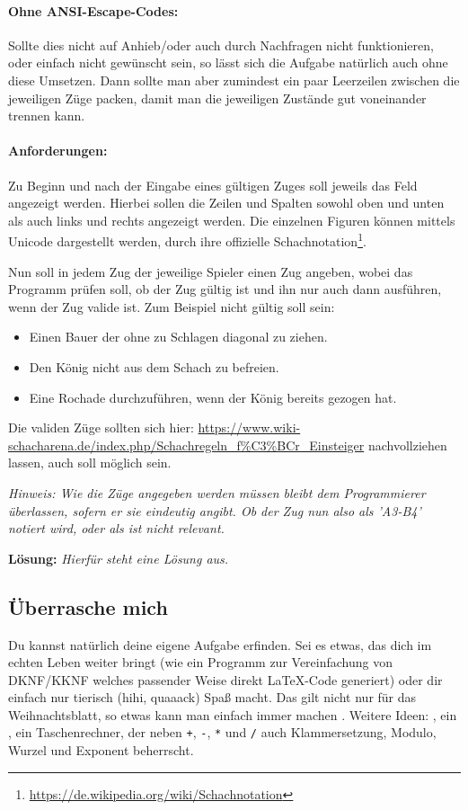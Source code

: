 \documentclass[table]{sopra-base}
\makeatletter
\let\T\texttt
\newenvironment{solution}{\null\par\noindent\textbf{\textcolor{sob@col@uulm@cs}{Lösung:}}\newline\bgroup\color{black}\slshape\ignorespaces}{\egroup}
\makeatother
\begin{document}
\paragraph{Ohne ANSI-Escape-Codes:}
Sollte dies nicht auf Anhieb/oder auch durch Nachfragen nicht funktionieren, oder einfach nicht gewünscht sein, so lässt sich die Aufgabe natürlich auch ohne diese Umsetzen.
Dann sollte man aber zumindest ein paar Leerzeilen zwischen die jeweiligen Züge packen, 
damit man die jeweiligen Zustände gut voneinander trennen kann.

\paragraph{Anforderungen:}
Zu Beginn und nach der Eingabe eines gültigen Zuges soll jeweils das Feld angezeigt werden.
Hierbei sollen die Zeilen und Spalten sowohl oben und unten als auch links und rechts angezeigt werden. Die einzelnen Figuren können mittels Unicode dargestellt werden, durch ihre offizielle Schachnotation\footnote{\url{https://de.wikipedia.org/wiki/Schachnotation}}.\par{}

Nun soll in jedem Zug der jeweilige Spieler einen Zug angeben, wobei das Programm prüfen soll, ob der Zug gültig ist und ihn nur auch dann ausführen, wenn der Zug valide ist. Zum Beispiel nicht gültig soll sein: \begin{itemize}[nolistsep]
    \item Einen Bauer der ohne zu Schlagen diagonal zu ziehen.
    \item Den König nicht aus dem Schach zu befreien.
    \item Eine Rochade durchzuführen, wenn der König bereits gezogen hat.
\end{itemize}
Die validen Züge sollten sich hier: \url{https://www.wiki-schacharena.de/index.php/Schachregeln_f%C3%BCr_Einsteiger} nachvollziehen lassen, auch \say{en passant} soll möglich sein.\par{}
\textit{Hinweis: Wie die Züge angegeben werden müssen bleibt dem Programmierer überlassen,
sofern er sie eindeutig angibt. Ob der Zug nun also als 'A3-B4' notiert wird, oder als \say{\T{axb4}} ist nicht relevant.}

\begin{solution}
    Hierfür steht eine Lösung aus.
\end{solution}

\subsection{Überrasche mich}

Du kannst natürlich deine eigene Aufgabe erfinden. Sei es etwas, das dich im echten Leben weiter bringt (wie ein Programm zur Vereinfachung von DKNF/KKNF welches passender Weise direkt \LaTeX-Code generiert) oder dir einfach nur tierisch (hihi, quaaack) Spaß macht. Das gilt nicht nur für das Weihnachtsblatt, so etwas kann man einfach immer machen \Laughey. Weitere Ideen: , ein , ein Taschenrechner, der neben \T{+}, \T{-}, \T{*} und \T{/} auch Klammersetzung, Modulo, Wurzel und Exponent beherrscht.
\end{document}
